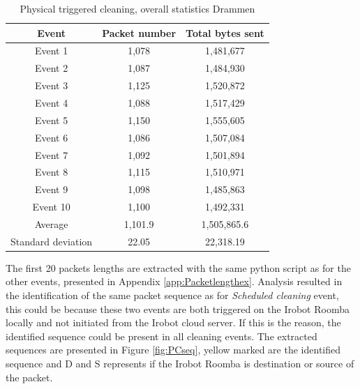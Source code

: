\begin{table}[H]
\centering
\caption{Physical triggered cleaning, overall statistics Drammen}
\label{tab:PCoverallDRA}
\begin{tabular}{|c|c|c|}
\hline
\textbf{Event} & \textbf{Packet number} & \textbf{Total bytes sent} \\ \hline
Event 1        & 1,078                   & 1,481,677                   \\ \hline
Event 2        & 1,087                   & 1,484,930                   \\ \hline
Event 3        & 1,125                   & 1,520,872                   \\ \hline
Event 4        & 1,088                   & 1,517,429                   \\ \hline
Event 5        & 1,150                   & 1,555,605                   \\ \hline
Event 6        & 1,086                   & 1,507,084                   \\ \hline
Event 7        & 1,092                   & 1,501,894                   \\ \hline
Event 8        & 1,115                   & 1,510,971                   \\ \hline
Event 9        & 1,098                   & 1,485,863                   \\ \hline
Event 10       & 1,100                   & 1,492,331                   \\ \hline
Average        & 1,101.9                 & 1,505,865.6                 \\ \hline
Standard deviation        &22.05
       & 22,318.19               \\ \hline
\end{tabular}
\end{table}

The first 20 packets lengths are extracted with the same python script as for the other events, presented in Appendix \ref{app:Packetlengthex}. Analysis resulted in the identification of the same packet sequence as for \textit{Scheduled cleaning} event, this could be because these two events are both triggered on the Irobot Roomba locally and not initiated from the Irobot cloud server. If this is the reason, the identified sequence could be present in all cleaning events. The extracted sequences are presented in Figure \ref{fig:PCseq}, yellow marked are the identified sequence and D and S represents if the Irobot Roomba is destination or source of the packet. 

